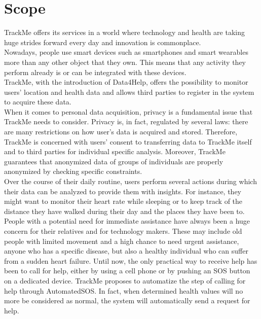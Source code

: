 \documentclass[../../rasd.tex]{subfiles}
\begin{document}
\section{Scope}
			TrackMe offers its services in a world where technology and health are taking huge strides forward every day and innovation is commonplace.\\
Nowadays, people use smart devices such as smartphones and smart wearables more than any other object that they own. This means that any activity they perform already is or can be integrated with these devices.\\
TrackMe, with the introduction of Data4Help, offers the possibility to monitor users’ location and health data and allows third parties to register in the system to acquire these data.\\

When it comes to personal data acquisition, privacy is a fundamental issue that TrackMe needs to consider. Privacy is, in fact, regulated by several laws: there are many restrictions on how user’s data is acquired and stored. Therefore, TrackMe is concerned with users’ consent to transferring data to TrackMe itself and to third parties for individual specific analysis. Moreover, TrackMe guarantees that anonymized data of groups of individuals are properly anonymized by checking specific constraints.\\

Over the course of their daily routine, users perform several actions during which their data can be analyzed to provide them with insights. For instance, they might want to monitor their heart rate while sleeping or to keep track of the distance they have walked during their day and the places they have been to.\\

People with a potential need for immediate assistance have always been a huge concern for their relatives and for technology makers. These may include old people with limited movement and a high chance to need urgent assistance, anyone who has a specific disease, but also a healthy individual who can suffer from a sudden heart failure. Until now, the only practical way to receive help has been to call for help, either by using a cell phone or by pushing an SOS button on a dedicated device. TrackMe proposes to automatize the step of calling for help through AutomatedSOS. In fact, when determined health values will no more be considered as normal, the system will automatically send a request for help.\\
\end{document}
